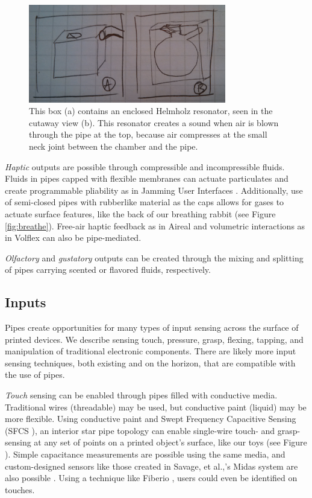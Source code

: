 \begin{figure}[h]
\centering
    \includegraphics[width=3.4in]{figures/placeholder/helmholz.jpg}
\caption{This box (a) contains an enclosed Helmholz resonator, seen in the cutaway view (b).  This resonator creates a sound when air is blown through the pipe at the top, because air compresses at the small neck joint between the chamber and the pipe.  }
\label{fig:ocarina}
\end{figure}

\emph{Haptic} outputs are possible through compressible and incompressible fluids.  Fluids in pipes capped with flexible membranes can actuate particulates and create programmable pliability as in Jamming User Interfaces \cite{Follmer-jamming}.  Additionally, use of semi-closed pipes with rubberlike material as the caps allows for gases to actuate surface features, like the back of our breathing rabbit (see Figure \ref{fig:breathe}).  Free-air haptic feedback as in Aireal \cite{Sodhi-aireal} and volumetric interactions as in Volflex \cite{Iwata-volflex} can also be pipe-mediated.

\emph{Olfactory} and \emph{gustatory} outputs can be created through the mixing and splitting of pipes carrying scented or flavored fluids, respectively.

\subsection{Inputs}

Pipes create opportunities for many types of input sensing across the surface of printed devices.  We describe sensing touch, pressure, grasp, flexing, tapping, and manipulation of traditional electronic components.  There are likely more input sensing techniques, both existing and on the horizon, that are compatible with the use of pipes.

\emph{Touch} sensing can be enabled through pipes filled with conductive media.  Traditional wires (threadable) may be used, but conductive paint (liquid) may be more flexible.  Using conductive paint and Swept Frequency Capacitive Sensing (SFCS \cite{Sato-touche}), an interior star pipe topology can enable single-wire touch- and grasp-sensing at any set of points on a printed object's surface, like our toys (see Figure \cite{fig:toys}).  Simple capacitance measurements are possible using the same media, and custom-designed sensors like those created in Savage, et al.,'s Midas system are also possible \cite{Savage-midas}.  Using a technique like Fiberio \cite{Holz-fiberio}, users could even be identified on touches.

